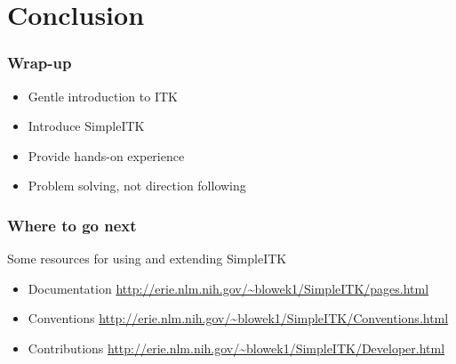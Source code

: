 \section{Conclusion}

\begin{frame}
\frametitle{Wrap-up}
\begin{itemize}
  \item Gentle introduction to ITK
  \item Introduce SimpleITK
  \item Provide hands-on experience
  \item Problem solving, not direction following
\end{itemize}
\end{frame}

\begin{frame}
\frametitle{Where to go next}
Some resources for using and extending SimpleITK
\small
\begin{itemize}
  \item Documentation \url{http://erie.nlm.nih.gov/~blowek1/SimpleITK/pages.html}
  \item Conventions \url{http://erie.nlm.nih.gov/~blowek1/SimpleITK/Conventions.html}
  \item Contributions \url{http://erie.nlm.nih.gov/~blowek1/SimpleITK/Developer.html}
\end{itemize}
\normalsize
\end{frame}
